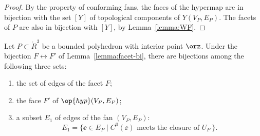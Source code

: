 \begin{proof} By the  property of conforming fans,
the faces of the hypermap are in bijection with the set
$[Y]$ of topological components of $Y(V_P,E_P)$.  The facets of $P$
are also in bijection with $[Y]$, by Lemma~\ref{lemma:WF}.
\end{proof}

\begin{lemma}[]\label{lemma:edge-bi}
Let $P\subset \ring{R}^3$ be a bounded polyhedron with interior point
$\orz$.  Under the bijection $F\leftrightarrow F'$ of Lemma~\ref{lemma:facet-bi},
there are bijections among the following three sets:
\begin{enumerate}
\item the set of edges of the facet $F$;
\item the face $F'$ of $\op{hyp}(V_P,E_P)$;
\item a subset $E_1$ of edges of the fan $(V_P,E_P)$:
\[
E_1 = \{ \ee \in E_P \mid C^0(\ee) \text{ meets the closure of }  U_{F'}  \}.
\]
\end{enumerate}
\end{lemma}

